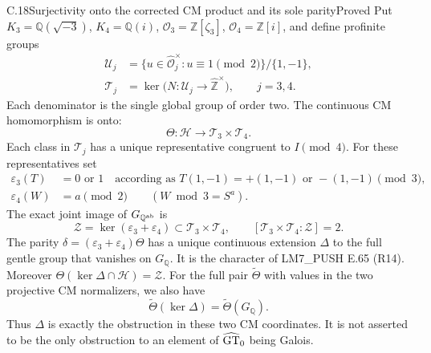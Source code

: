 \begin{statement}{C.18}{Surjectivity onto the corrected CM product and its sole parity}{Proved}
Put \(K_3=\mathbb Q(\sqrt{-3})\), \(K_4=\mathbb Q(i)\),
\(\mathcal O_3=\mathbb Z[\zeta_3]\),
\(\mathcal O_4=\mathbb Z[i]\), and define profinite groups
\[
 \begin{split}
 \mathcal U_j&=
  \{u\in\widehat{\mathcal O}_j^{\times}:u\equiv1\pmod2\}
                                    /\{1,-1\},\\
 \mathcal T_j&=\ker\bigl(N:\mathcal U_j
                                  \to\widehat{\mathbb Z}^{\times}\bigr),
                  \qquad j=3,4 .
 \end{split}
 \tag{C.18a}
\]
Each denominator is the single global group of order
two. The continuous CM homomorphism is onto:
\[
 \Theta:\mathcal H\longrightarrow\mathcal T_3\times\mathcal T_4.
 \tag{C.18b}
\]
Each class in \(\mathcal T_j\) has a unique
representative congruent to \(I\pmod4\).
For these representatives set
\[
 \begin{split}
 \varepsilon_3(T)&=0\text{ or }1
    \quad\text{according as }T(1,-1)=+(1,-1)
                       \text{ or }-(1,-1)\pmod3,\\
 \varepsilon_4(W)&=a\pmod2\qquad(W\bmod3=S^a).
 \end{split}
 \tag{C.18c}
\]
The exact joint image of \(G_{\mathbb Q^{\rm ab}}\) is
\[
 \mathcal Z=\ker(\varepsilon_3+\varepsilon_4)
                \subset\mathcal T_3\times\mathcal T_4,
 \qquad [\mathcal T_3\times\mathcal T_4:\mathcal Z]=2.
 \tag{C.18d}
\]
The parity \(\delta=(\varepsilon_3+\varepsilon_4)\Theta\)
has a unique continuous extension \(\Delta\) to the
full gentle group that vanishes on \(G_{\mathbb Q}\).
It is the character of LM7\_PUSH E.65 (R14).
Moreover \(\Theta(\ker\Delta\cap\mathcal H)=\mathcal Z\).
For the full pair \(\widetilde\Theta\) with values in
the two projective CM normalizers, we also have
\[
 \widetilde\Theta(\ker\Delta)
           =\widetilde\Theta(G_{\mathbb Q}).
 \tag{C.18n}
\]
Thus \(\Delta\) is exactly the obstruction in these
two CM coordinates. It is not asserted to be the only
obstruction to an element of \(\widehat{\rm GT}_0\)
being Galois.
\end{statement}
